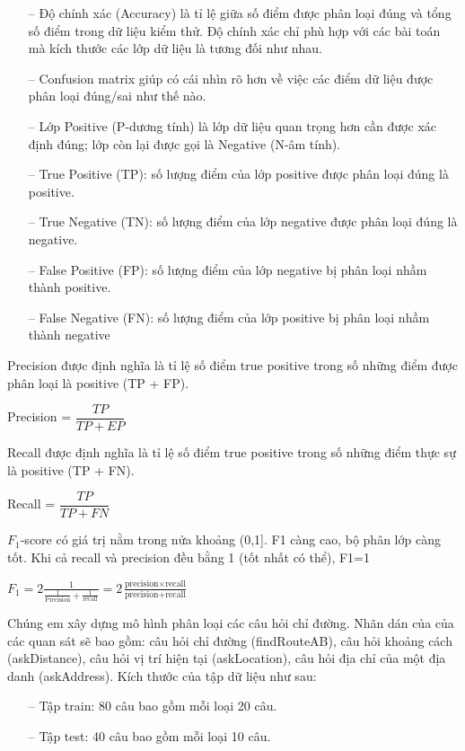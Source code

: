 \begin{itemize}
    \item[--] Độ chính xác (Accuracy) là tỉ lệ giữa số điểm được phân loại đúng và tổng số điểm trong dữ liệu kiểm thử. Độ chính xác chỉ phù hợp với các bài toán mà kích thước các lớp dữ liệu là tương đối như nhau.
    \item[--] Confusion matrix giúp có cái nhìn rõ hơn về việc các điểm dữ liệu được phân loại đúng/sai như thế nào.
    \item[--] Lớp Positive (P-dương tính) là lớp dữ liệu quan trọng hơn cần được xác định đúng; lớp còn lại được gọi là Negative (N-âm tính).
    \item[--] True Positive (TP): số lượng điểm của lớp positive được phân loại đúng là positive.
    \item[--] True Negative (TN): số lượng điểm của lớp negative được phân loại đúng là negative.
    \item[--] False Positive (FP): số lượng điểm của lớp negative bị phân loại nhầm thành positive.
    \item[--] False Negative (FN): số lượng điểm của lớp positive bị phân loại nhầm thành negative
\end{itemize}

Precision được định nghĩa là tỉ lệ số điểm true positive trong số những điểm được phân loại là positive (TP + FP).
\begin{center}
    Precision = $\dfrac{TP}{TP+EP}$
\end{center}

Recall được định nghĩa là tỉ lệ số điểm true positive trong số những điểm thực sự là positive (TP + FN).
\begin{center}
    Recall = $\dfrac{TP}{TP+FN}$
\end{center}

$F_{1}$-score có giá trị nằm trong nửa khoảng (0,1]. F1 càng cao, bộ phân lớp càng tốt. Khi cả recall và precision đều bằng 1 (tốt nhất có thể), F1=1
\begin{center}
    $F_{1}=2\frac{1}{\frac{1}{\text{Precision}} + \frac{1}{\text{recall}}}= 2\frac{\text{precision} \times \text{recall}}{\text{precision} + \text{recall}}$
\end{center}

Chúng em xây dựng mô hình phân loại các câu hỏi chỉ đường. Nhãn dán của của các quan sát sẽ bao gồm: câu hỏi chỉ đường (findRouteAB), câu hỏi khoảng cách (askDistance), câu hỏi vị trí hiện tại (askLocation), câu hỏi địa chỉ của một địa danh (askAddress). Kích thước của tập dữ liệu như sau:
\begin{itemize}
    \item[--] Tập train: 80 câu bao gồm mỗi loại 20 câu.
    \item[--] Tập test: 40 câu bao gồm mỗi loại 10 câu.
\end{itemize}

